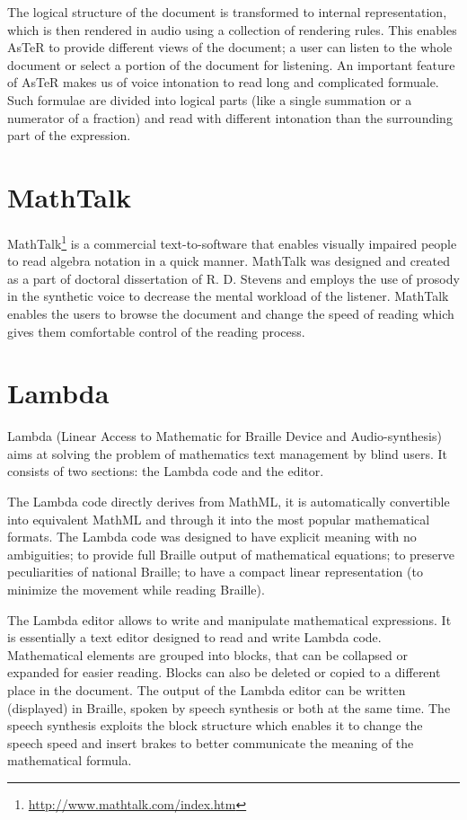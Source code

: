 \documentclass[11pt,oneside,final]{fithesis2}
\begin{document}
The logical structure of the document is transformed to internal representation, which is then rendered in audio using a collection of rendering rules. This enables AsTeR to provide different views of the document; a user can listen to the whole document or select a portion of the document for listening. An important feature of AsTeR makes us of voice intonation to read long and complicated formuale. Such formulae are divided into logical parts (like a single summation or a numerator of a fraction) and read with different intonation than the surrounding part of the expression. 

\section{MathTalk}
MathTalk\footnote{\url{http://www.mathtalk.com/index.htm}} \cite{mathtalk:stevens1994mathtalk} is a commercial text-to-software that enables visually impaired people to read algebra notation in a quick manner. MathTalk was designed and created as a part of doctoral dissertation of R. D. Stevens \cite{mathtalk:stevens1996principles} and employs the use of prosody in the synthetic voice to decrease the mental workload of the listener. MathTalk enables the users to browse the document and change the speed of reading which gives them comfortable control of the reading process.

\section{Lambda}
Lambda \cite{lambda:schweikhardt2006lambda} (Linear Access to Mathematic for Braille Device and Audio-synthesis) aims at solving the problem of mathematics text management by blind users. It consists of two sections: the Lambda code and the editor.

The Lambda code directly derives from MathML, it is automatically convertible into equivalent MathML and through it into the most popular mathematical formats. The Lambda code was designed to have explicit meaning with no ambiguities; to provide full Braille output of mathematical equations; to preserve peculiarities of national Braille; to have a compact linear representation (to minimize the movement while reading Braille).

The Lambda editor allows to write and manipulate mathematical expressions. It is essentially a text editor designed to read and write Lambda code. Mathematical elements are grouped into blocks, that can be collapsed or expanded for easier reading. Blocks can also be deleted or copied to a different place in the document. The output of the Lambda editor can be written (displayed) in Braille, spoken by speech synthesis or both at the same time. The speech synthesis exploits the block structure which enables it to change the speech speed and insert brakes to better communicate the meaning of the mathematical formula. 
\end{document}
